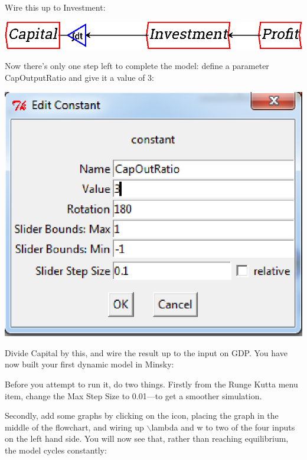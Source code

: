 
Wire this up to Investment:

\begin{center}
\includegraphics{images/NewItem104.eps}
\end{center}

Now there's only one step left to complete the model: define a
parameter CapOutputRatio and give it a value of 3:

\begin{center}
\includegraphics{images/NewItem103.eps}
\end{center}


Divide Capital by this, and wire the result up to the input on
GDP. You have now built your first dynamic model in Minsky: 


Before you attempt to run it, do two things. Firstly from the Runge
Kutta menu item, change the Max Step Size to 0.01---to get a smoother
simulation. 


Secondly, add some graphs by clicking on the
 icon, placing the graph
in the middle of the flowchart, and wiring up $\backslash$lambda and w to two of
the four inputs on the left hand side. You will now see that, rather
than reaching equilibrium, the model cycles constantly:

